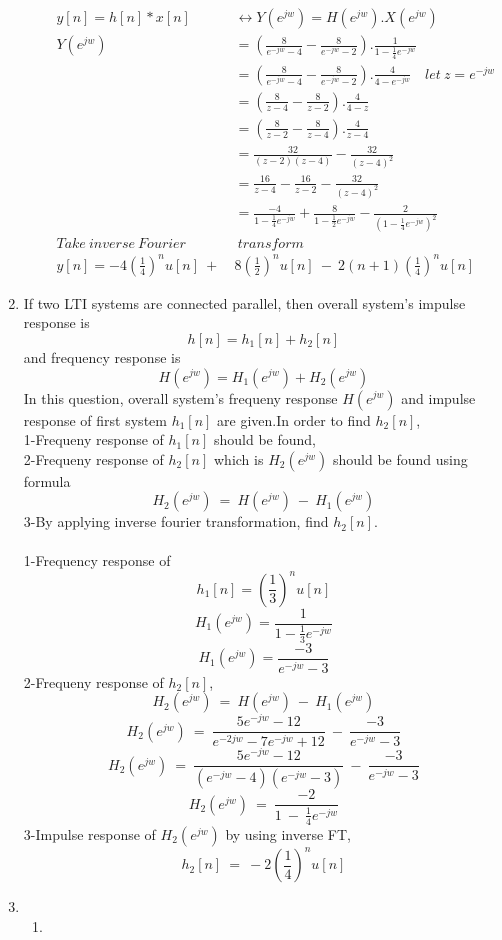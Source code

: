 \documentclass[10pt,a4paper, margin=1in]{article}
\begin{document}
\begin{enumerate}
\begin{enumerate}
\begin{align*}
    y[n] = h[n] \ast x[n] &\longleftrightarrow Y(e^{jw}) = H(e^{jw}).X(e^{jw}) \\
    Y(e^{jw}) &= (\frac{8}{e^{-jw }-4} - \frac{8}{e^{-jw} - 2}).\frac{1}{1-\frac{1}{4}e^{-jw}} \\
    &= (\frac{8}{e^{-jw }-4} - \frac{8}{e^{-jw} - 2}).\frac{4}{4-e^{-jw}} \quad let \ z = e^{-jw} \\
    &= (\frac{8}{z-4} - \frac{8}{z - 2}).\frac{4}{4-z} \\
    &= (\frac{8}{z-2} - \frac{8}{z - 4}).\frac{4}{z-4} \\
    &= \frac{32}{(z-2)(z-4)} - \frac{32}{(z - 4)^2} \\
    &= \frac{16}{z-4} - \frac{16}{z-2}- \frac{32}{(z - 4)^2} \\
    &= \frac{-4}{1-\frac{1}{4}e^{-jw}} + \frac{8}{1-\frac{1}{2}e^{-jw}}- \frac{2}{(1 - \frac{1}{4}e^{-jw})^2} \\
    Take \ inverse \ Fourier &\ transform \\
    y[n] = -4(\frac{1}{4})^nu[n] \  + \  &8(\frac{1}{2})^nu[n] \ - \ 2(n+1)(\frac{1}{4})^nu[n]
    \end{align*}
    
    \end{enumerate}


\item %
If two LTI systems are connected parallel, then overall system's impulse response is 
$$ h[n] = h_1[n] + h_2[n]$$ and frequency response is $$ H(e^{jw}) = H_1(e^{jw}) + H_2(e^{jw})$$
In this question, overall system's frequeny response $H(e^{jw})$ and impulse response of first system $h_1[n]$ are given.In order to find $ h_2[n] $,\\ 
1-Frequeny response of $h_1[n]$ should be found,\\ 
2-Frequeny response of $h_2[n]$ which is $H_2(e^{jw})$ should be found using formula $$ H_2(e^{jw})\ =\ H(e^{jw})\ -\ H_1(e^{jw})$$
3-By applying inverse fourier transformation, find $h_2[n]$.\\\\

1-Frequency response of $$h_1[n]= (\frac{1}{3})^nu[n]$$ $$H_1(e^{jw}) = \frac{1}{1 - \frac{1}{3}e^{-jw}}$$ $$ H_1(e^{jw}) = \frac{-3}{e^{-jw}-3}$$
2-Frequeny response of $h_2[n]$, $$ H_2(e^{jw})\ =\ H(e^{jw})\ -\ H_1(e^{jw})$$
$$H_2(e^{jw})\ =\ \frac{5e^{-jw}-12}{e^{-2jw}-7e^{-jw}+12}\ -\ \frac{-3}{e^{-jw}-3}$$  
$$H_2(e^{jw})\ =\ \frac{5e^{-jw}-12}{(e^{-jw}-4)(e^{-jw}-3)}\ -\ \frac{-3}{e^{-jw}-3}$$ $$H_2(e^{jw})\ =\ \frac{-2}{1\ -\ \frac{1}{4}e^{-jw}} $$
3-Impulse response of $H_2(e^{jw})$ by using inverse FT, $$ h_2[n]\ =\ -2(\frac{1}{4})^nu[n] $$
\item      
    \begin{enumerate}
    \item %
    

\end{enumerate}
\end{enumerate}
\end{document}
